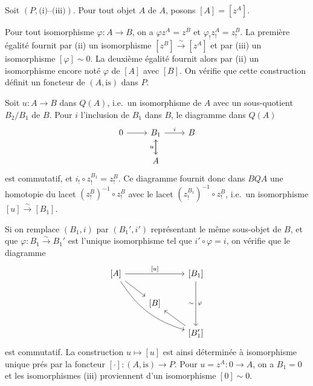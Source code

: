 \documentclass[12pt,a4paper]{article}
\theoremstyle{plain}
\theoremstyle{definition}
\begin{document}
\subsection{}

Soit $(P, \text{(i)--(iii)})$. Pour tout objet $A$ de $A$, posons $[A] = [z^A]$.

Pour tout isomorphisme $\varphi: A \to B$, on a $\varphi z^A = z^B$ et $\varphi_! z_!^A = z_!^B$. La premi\`ere
\'egalit\'e fournit par (ii) un isomorphisme $[z^B] \xrightarrow{\sim} [z^A]$ et par (iii) un isomorphisme
$[\varphi] \sim 0$. La deuxi\`eme \'egalit\'e fournit alors par (ii) un isomorphisme encore not\'e $\varphi$
de $[A]$ avec $[B]$. On v\'erifie que cette construction d\'efinit un foncteur de $(A, \text{is})$
dans $P$.

\medskip

Soit $u: A \to B$ dans $Q(A)$, i.e.\ un isomorphisme de $A$ avec un sous-quotient
$B_2/B_1$ de $B$. Pour $i$ l'inclusion de $B_1$ dans $B$, le diagramme dans $Q(A)$
\[
\begin{tikzcd}
0 \arrow[r] & B_1 \arrow[r, "i"] \arrow[d] & B \\
& A \arrow[u, "u"]
\end{tikzcd}
\]
est commutatif, et $i_! \circ z_!^{B_1} = z_!^B$. Ce diagramme fournit donc dans $BQA$ une homotopie
du lacet $(z_!^B)^{-1} \circ z_!^B$ avec le lacet $(z_!^{B_1})^{-1} \circ z_!^B$, i.e.\ un isomorphisme $[u] \xrightarrow{\sim} [B_1]$.

Si on remplace $(B_1, i)$ par $(B_1', i')$ repr\'esentant le m\^eme sous-objet de $B$,
et que $\varphi: B_1 \xrightarrow{\sim} B_1'$ est l'unique isomorphisme tel que $i' \circ \varphi = i$, on v\'erifie que
le diagramme
\[
\begin{tikzcd}
{[A]} \arrow[rr, "{[u]}"] \arrow[dr] \arrow[ddrr, bend right=20] & & {[B_1]} \arrow[dd, "\varphi", "\sim"'] \\
& {[B]} & \\
& & {[B_1']} \arrow[ul]
\end{tikzcd}
\]
est commutatif. La construction $u \mapsto [u]$ est ainsi d\'etermin\'ee \`a isomorphisme
unique pr\'es par la foncteur $[\cdot]: (A, \text{is}) \to P$. Pour $u = z^A: 0 \to A$, on a
$B_1 = 0$ et les isomorphismes (iii) proviennent d'un isomorphisme $[0] \sim 0$.

\medskip
\end{document}
